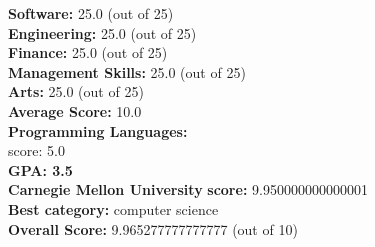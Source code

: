 \documentclass{article}
\begin{document}
\textbf{Software:} 25.0 (out of 25)\\
    \textbf{Engineering: } 25.0 (out of 25)\\
    \textbf{Finance:} 25.0 (out of 25)\\
    \textbf{Management Skills:} 25.0 (out of 25)\\
    \textbf{Arts:} 25.0 (out of 25)\\
\textbf{Average Score: } 10.0\\
\textbf{Programming Languages:} \\
score: 5.0\\
\textbf{GPA: 3.5}\\
\textbf{Carnegie Mellon University} \textbf{score:} 9.950000000000001\\
\textbf{Best category: } computer science\\
    \textbf{Overall Score: }9.965277777777777 (out of 10)
\end{document}

